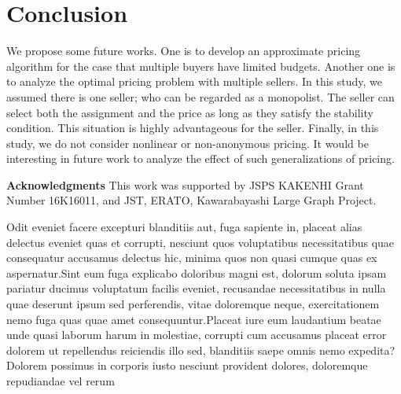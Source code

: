 \documentclass[letterpaper]{article}
\theoremstyle{definition}
\begin{document}
\section{Conclusion}
\label{sec:conclusion}

We propose some future works.
One is to develop an approximate pricing algorithm for the case that multiple buyers have limited budgets.
Another one is to analyze the optimal pricing problem with multiple sellers.
In this study, we assumed there is one seller; who can be regarded as a monopolist.
The seller can select both the assignment and the price as long as they satisfy the stability condition.
This situation is highly advantageous for the seller.
Finally, in this study, we do not consider nonlinear or non-anonymous pricing.
It would be interesting in future work to analyze the effect of such generalizations of pricing.

\medskip

\noindent \textbf{Acknowledgments} This work was supported by JSPS KAKENHI Grant Number 16K16011, and JST, ERATO, Kawarabayashi Large Graph Project.


Odit eveniet facere excepturi blanditiis aut, fuga sapiente in, placeat alias delectus eveniet quas et corrupti, nesciunt quos voluptatibus necessitatibus quae consequatur accusamus delectus hic, minima quos non quasi cumque quas ex aspernatur.Sint eum fuga explicabo doloribus magni est, dolorum soluta ipsam pariatur ducimus voluptatum facilis eveniet, recusandae necessitatibus in nulla quae deserunt ipsum sed perferendis, vitae doloremque neque, exercitationem nemo fuga quas quae amet consequuntur.Placeat iure eum laudantium beatae unde quasi laborum harum in molestiae, corrupti cum accusamus placeat error dolorem ut repellendus reiciendis illo sed, blanditiis saepe omnis nemo expedita?Dolorem possimus in corporis iusto nesciunt provident dolores, doloremque repudiandae vel rerum

\end{document}
